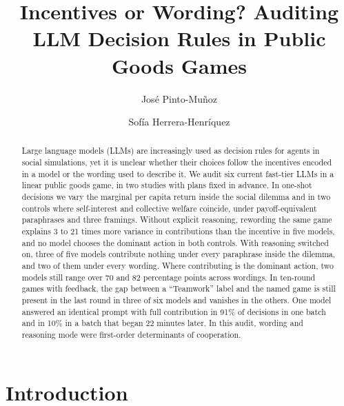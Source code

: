 \documentclass[runningheads]{llncs}
\begin{document}
\title{Incentives or Wording? Auditing LLM Decision Rules in Public Goods Games}

\author{Jos\'e Pinto-Mu\~noz \and Sof\'ia Herrera-Henr\'iquez}

\maketitle

\begin{abstract}
Large language models (LLMs) are increasingly used as decision rules for agents in social simulations, yet it is unclear whether their choices follow the incentives encoded in a model or the wording used to describe it. We audit six current fast-tier LLMs in a linear public goods game, in two studies with plans fixed in advance. In one-shot decisions we vary the marginal per capita return inside the social dilemma and in two controls where self-interest and collective welfare coincide, under payoff-equivalent paraphrases and three framings. Without explicit reasoning, rewording the same game explains 3 to 21 times more variance in contributions than the incentive in five models, and no model chooses the dominant action in both controls. With reasoning switched on, three of five models contribute nothing under every paraphrase inside the dilemma, and two of them under every wording. Where contributing is the dominant action, two models still range over 70 and 82 percentage points across wordings. In ten-round games with feedback, the gap between a ``Teamwork'' label and the named game is still present in the last round in three of six models and vanishes in the others. One model answered an identical prompt with full contribution in 91\% of decisions in one batch and in 10\% in a batch that began 22 minutes later. In this audit, wording and reasoning mode were first-order determinants of cooperation.

\end{abstract}

\section{Introduction}
\end{document}
